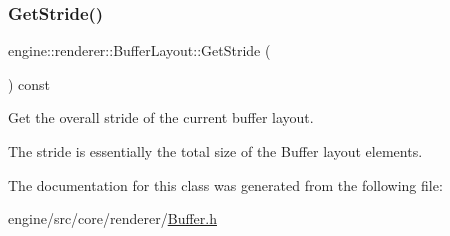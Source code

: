 \subsubsection{\texorpdfstring{Get\+Stride()}{GetStride()}}
{\footnotesize\ttfamily engine\+::renderer\+::\+Buffer\+Layout\+::\+Get\+Stride (\begin{DoxyParamCaption}{ }\end{DoxyParamCaption}) const\hspace{0.3cm}{\ttfamily [inline]}}



Get the overall stride of the current buffer layout. 

The stride is essentially the total size of the Buffer layout elements. 

The documentation for this class was generated from the following file\+:\begin{DoxyCompactItemize}
\item 
engine/src/core/renderer/\hyperlink{Buffer_8h}{Buffer.\+h}\end{DoxyCompactItemize}
